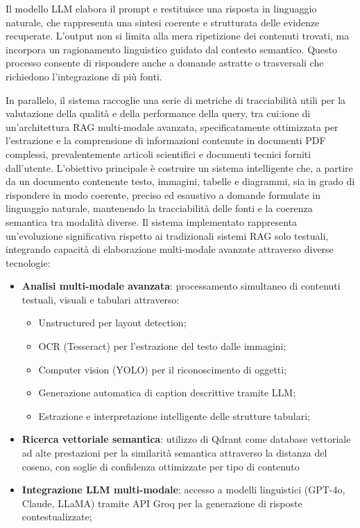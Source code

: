 Il modello LLM elabora il prompt e restituisce una risposta in linguaggio naturale, che rappresenta una sintesi coerente e strutturata delle evidenze recuperate. L'output non si limita alla mera ripetizione dei contenuti trovati, ma incorpora un ragionamento linguistico guidato dal contesto semantico. Questo processo consente di rispondere anche a domande astratte o trasversali che richiedono l'integrazione di più fonti.

In parallelo, il sistema raccoglie una serie di metriche di tracciabilità utili per la valutazione della qualità e della performance della query, tra cui:ione di un'architettura RAG multi-modale avanzata, specificatamente ottimizzata per l'estrazione e la comprensione di informazioni contenute in documenti PDF complessi, prevalentemente articoli scientifici e documenti tecnici forniti dall'utente. L'obiettivo principale è costruire un sistema intelligente che, a partire da un documento contenente testo, immagini, tabelle e diagrammi, sia in grado di rispondere in modo coerente, preciso ed esaustivo a domande formulate in linguaggio naturale, mantenendo la tracciabilità delle fonti e la coerenza semantica tra modalità diverse. Il sistema implementato rappresenta un'evoluzione significativa rispetto ai tradizionali sistemi RAG solo testuali, integrando capacità di elaborazione multi-modale avanzate attraverso diverse tecnologie:

\begin{itemize} 
    \item \textbf{Analisi multi-modale avanzata}: processamento simultaneo di contenuti testuali, visuali e tabulari attraverso: 
    \begin{itemize}
        \item Unstructured per layout detection;
    \end{itemize}
    \begin{itemize} 
        \item OCR (Tesseract) per l'estrazione del testo dalle immagini;
        \item Computer vision (YOLO) per il riconoscimento di oggetti; 
        \item Generazione automatica di caption descrittive tramite LLM; 
        \item Estrazione e interpretazione intelligente delle strutture tabulari; 
    \end{itemize} 
    \item \textbf{Ricerca vettoriale semantica}: utilizzo di Qdrant come database vettoriale ad alte prestazioni per la similarità semantica attraverso la distanza del coseno, con soglie di confidenza ottimizzate per tipo di contenuto \item \textbf{Integrazione LLM multi-modale}: accesso a modelli linguistici  (GPT-4o, Claude, LLaMA) tramite API Groq per la generazione di risposte contestualizzate; 
\end{itemize}

